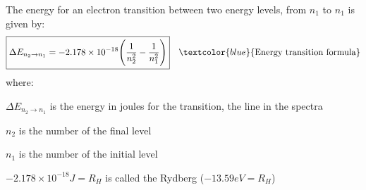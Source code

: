 \documentclass[main.tex]{subfiles}
\begin{document}
\begin{description}
 
 
 
The energy for an electron transition between two energy levels, from $n_1$ to $n_1$ is given by:
\begin{equation*}
\boxed{  \Delta E_{n_2\rightarrow n_1}=-2.178\times 10^{-18} \Bigg( \frac{1}{n_2^2}-\frac{1}{n_1^2}\Bigg)  } \quad \textcolor{blue}{\text{Energy transition formula}}
\end{equation*}
where:
\begin{where}
 \item $\Delta E_{{n_2}\rightarrow n{_1}}$   is the energy in joules for the transition, the line in the spectra
 \item $n_2$  is the number of the final level
  \item $n_1$  is the number of the initial level
    \item $-2.178\times 10^{-18}J=R_H$  is called the Rydberg ($-13.59eV=R_H$)

\end{where}



\end{description}
\end{document}
